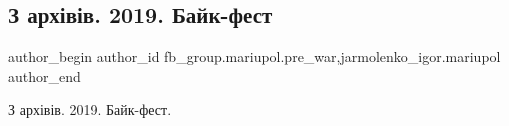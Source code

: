 
 
 
 
 

\subsection{З архівів. 2019. Байк-фест}
\label{sec:25_01_2023.fb.fb_group.mariupol.pre_war.3.z_arkh_v_v__2019__ba}
 
\ifcmt
 author_begin
   author_id fb_group.mariupol.pre_war,jarmolenko_igor.mariupol
 author_end
\fi

З архівів. 2019. Байк-фест.

